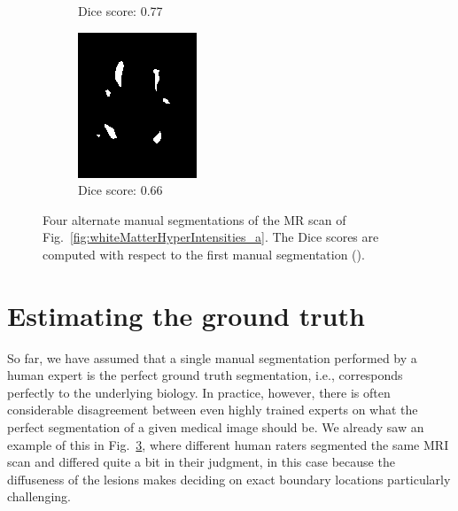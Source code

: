 \documentclass[10pt,twoside]{book}
\begin{document}
\begin{figure}
\begin{subfigure}{0.32\textwidth}
    \caption{Dice score: 0.77}
    \label{fig:Dice_c}
  \end{subfigure}
  \begin{subfigure}{0.32\textwidth}
    \centering
    \includegraphics[width=\textwidth]{segmentation4}
    \caption{Dice score: 0.66}
    \label{fig:Dice_d}
  \end{subfigure}
  \caption{Four alternate manual segmentations of the MR scan of Fig.~\ref{fig:whiteMatterHyperIntensities_a}. The Dice scores are computed with respect to the first manual segmentation ().}
  \label{fig:Dice}
\end{figure}



\section{Estimating the ground truth}

So far, we have assumed that a single manual segmentation performed by a human expert is the perfect ground truth segmentation, i.e., corresponds perfectly to the underlying biology. 
In practice, however, there is often considerable disagreement between even highly trained experts on what the perfect segmentation of a given medical image should be. We already saw 
an example of this in Fig.~\ref{fig:Dice}, where different human raters segmented the same MRI scan 
and differed quite a bit in their judgment, in this case because the diffuseness of the lesions makes deciding on exact boundary locations particularly challenging. 
\end{document}
